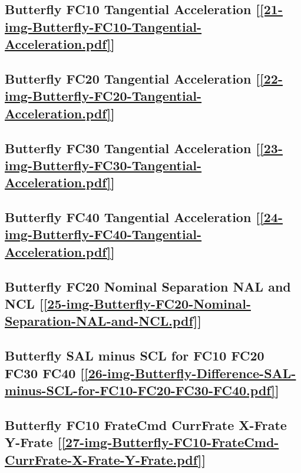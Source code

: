 \subsection       {Butterfly FC10 Tangential Acceleration
	[\ref      {21-img-Butterfly-FC10-Tangential-Acceleration.pdf}] }
\label{ssec-21-img-Butterfly-FC10-Tangential-Acceleration.pdf}

\subsection       {Butterfly FC20 Tangential Acceleration
	[\ref      {22-img-Butterfly-FC20-Tangential-Acceleration.pdf}] }
\label{ssec-22-img-Butterfly-FC20-Tangential-Acceleration.pdf}

\subsection       {Butterfly FC30 Tangential Acceleration
	[\ref      {23-img-Butterfly-FC30-Tangential-Acceleration.pdf}] }
\label{ssec-23-img-Butterfly-FC30-Tangential-Acceleration.pdf}

\subsection       {Butterfly FC40 Tangential Acceleration
	[\ref      {24-img-Butterfly-FC40-Tangential-Acceleration.pdf}] }
\label{ssec-24-img-Butterfly-FC40-Tangential-Acceleration.pdf}

\subsection       {Butterfly FC20 Nominal Separation NAL and NCL
	[\ref      {25-img-Butterfly-FC20-Nominal-Separation-NAL-and-NCL.pdf}] }
\label{ssec-25-img-Butterfly-FC20-Nominal-Separation-NAL-and-NCL.pdf}

\subsection       {Butterfly SAL minus SCL for FC10 FC20 FC30 FC40
	[\ref      {26-img-Butterfly-Difference-SAL-minus-SCL-for-FC10-FC20-FC30-FC40.pdf}] }
\label{ssec-26-img-Butterfly-Difference-SAL-minus-SCL-for-FC10-FC20-FC30-FC40.pdf}


\subsection       {Butterfly FC10 FrateCmd CurrFrate X-Frate Y-Frate
	[\ref      {27-img-Butterfly-FC10-FrateCmd-CurrFrate-X-Frate-Y-Frate.pdf}] }
\label{ssec-27-img-Butterfly-FC10-FrateCmd-CurrFrate-X-Frate-Y-Frate.pdf}

